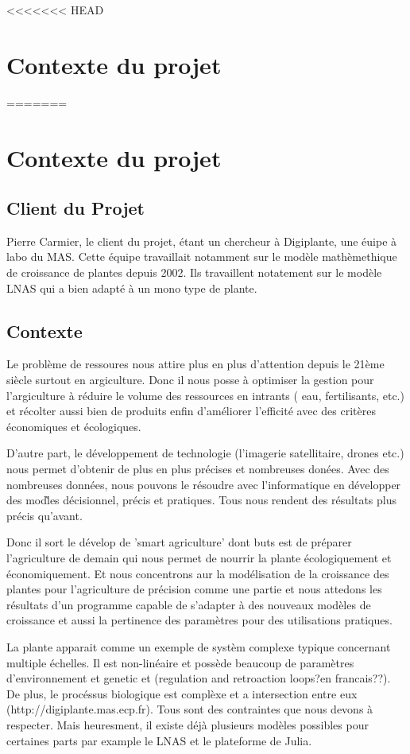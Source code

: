 <<<<<<< HEAD
\section{Contexte du projet}
=======
\section{Contexte du projet}

\subsection{Client du Projet}

Pierre Carmier, le client du projet, \'etant un chercheur à Digiplante, une \'euipe à labo du MAS. Cette \'equipe travaillait notamment sur le mod\`ele math\`emethique de croissance de plantes depuis 2002. Ils travaillent notatement sur le mod\`ele LNAS qui a bien adapt\'e \`a un mono type de plante.
\subsection{Contexte}

Le probl\`eme de ressoures nous attire plus en plus d'attention depuis le 21\`eme si\`ecle surtout en argiculture. Donc il nous posse \`a optimiser la gestion pour l'argiculture \`a r\'eduire le volume des ressources en intrants ( eau, fertilisants, etc.) et r\'ecolter aussi bien de produits enfin d'am\'eliorer l'efficit\'e avec des crit\`eres \'economiques et \'ecologiques.

D'autre part, le d\'eveloppement de technologie (l'imagerie satellitaire, drones etc.) nous permet d'obtenir de plus en plus pr\'ecises et nombreuses don\'ees. Avec des nombreuses donn\'ees, nous pouvons le r\'esoudre avec l'informatique en d\'evelopper des mod\`les d\'ecisionnel, pr\'ecis et pratiques. Tous nous rendent des r\'esultats plus pr\'ecis qu'avant.

Donc il sort le d\'evelop de 'smart agriculture' dont buts est de pr\'eparer l'agriculture de demain qui nous permet de nourrir la plante \'ecologiquement et  \'economiquement. Et nous concentrons aur la mod\'elisation de la croissance des plantes pour l'agriculture de pr\'ecision comme une partie et nous attedons les r\'esultats d'un programme capable de s'adapter \`a des nouveaux mod\`eles de croissance et aussi la pertinence des param\`etres pour des utilisations pratiques. 

La plante apparait comme un exemple de syst\`em complexe typique concernant multiple \'echelles. Il est non-lin\'eaire et poss\`ede beaucoup de param\`etres d'environnement et genetic et (regulation and retroaction loops?en francais??). De plus,  le proc\'essus biologique est compl\`exe et a intersection entre eux (http://digiplante.mas.ecp.fr). Tous sont des contraintes que nous devons \`a respecter. Mais heuresment, il existe d\'ej\`a plusieurs mod\`eles possibles pour certaines parts par example le LNAS et le plateforme de Julia.

